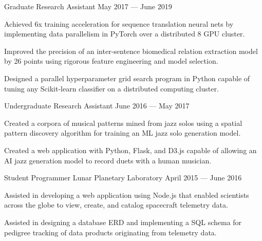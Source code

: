 \begin{cventries}
  \cventry
    {Graduate Research Assistant} %
    {} %
    {} %
    {May 2017 --- June 2019} %
    {
      \vspace{-0.1cm}
      \begin{cvitems} %
        \item Achieved 6x training acceleration for sequence translation neural nets by implementing data parallelism in PyTorch over a distributed 8 GPU cluster.
        \item Improved the precision of an inter-sentence biomedical relation extraction model by 26 points using rigorous feature engineering and model selection.
        \item Designed a parallel hyperparameter grid search program in Python capable of tuning any Scikit-learn classifier on a distributed computing cluster.
      \end{cvitems}
    }
    \vspace{.07cm}
  \cventry
    {Undergraduate Research Assistant} %
    {} %
    {} %
    {June 2016 --- May 2017} %
    {
      \vspace{-0.1cm}
      \begin{cvitems} %
        \item Created a corpora of musical patterns mined from jazz solos using a spatial pattern discovery algorithm for training an ML jazz solo generation model.
        \item Created a web application with Python, Flask, and D3.js capable of allowing an AI jazz generation model to record duets with a human musician.
      \end{cvitems}
    }
    \vspace{.2cm}
  \cventry
    {Student Programmer} %
    {Lunar Planetary Laboratory} %
    {April 2015 --- June 2016} %
    {} %
    {
      \vspace{-0.1cm}
      \begin{cvitems} %
        \item Assisted in developing a web application using Node.js that enabled scientists across the globe to view, create, and catalog spacecraft telemetry data.
        \item Assisted in designing a database ERD and implementing a SQL schema for pedigree tracking of data products originating from telemetry data.
      \end{cvitems}
    }

\end{cventries}
